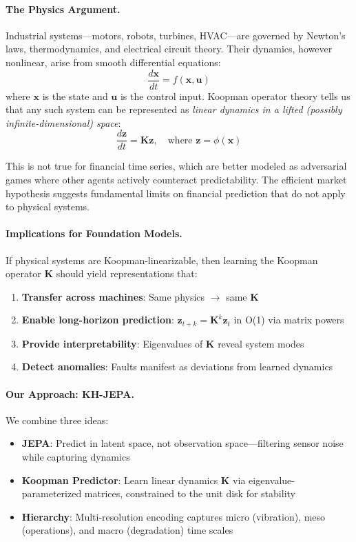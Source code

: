 \documentclass{article}
\begin{document}
\paragraph{The Physics Argument.} Industrial systems—motors, robots, turbines, HVAC—are governed by Newton's laws, thermodynamics, and electrical circuit theory. Their dynamics, however nonlinear, arise from smooth differential equations:
\begin{equation}
    \frac{d\mathbf{x}}{dt} = f(\mathbf{x}, \mathbf{u})
\end{equation}
where $\mathbf{x}$ is the state and $\mathbf{u}$ is the control input. Koopman operator theory \cite{koopman1931} tells us that any such system can be represented as \emph{linear dynamics in a lifted (possibly infinite-dimensional) space}:
\begin{equation}
    \frac{d\mathbf{z}}{dt} = \mathbf{K} \mathbf{z}, \quad \text{where } \mathbf{z} = \phi(\mathbf{x})
\end{equation}

This is not true for financial time series, which are better modeled as adversarial games where other agents actively counteract predictability. The efficient market hypothesis suggests fundamental limits on financial prediction that do not apply to physical systems.

\paragraph{Implications for Foundation Models.} If physical systems are Koopman-linearizable, then learning the Koopman operator $\mathbf{K}$ should yield representations that:
\begin{enumerate}
    \item \textbf{Transfer across machines}: Same physics $\rightarrow$ same $\mathbf{K}$
    \item \textbf{Enable long-horizon prediction}: $\mathbf{z}_{t+k} = \mathbf{K}^k \mathbf{z}_t$ in O(1) via matrix powers
    \item \textbf{Provide interpretability}: Eigenvalues of $\mathbf{K}$ reveal system modes
    \item \textbf{Detect anomalies}: Faults manifest as deviations from learned dynamics
\end{enumerate}

\paragraph{Our Approach: KH-JEPA.} We combine three ideas:
\begin{itemize}
    \item \textbf{JEPA}: Predict in latent space, not observation space—filtering sensor noise while capturing dynamics
    \item \textbf{Koopman Predictor}: Learn linear dynamics $\mathbf{K}$ via eigenvalue-parameterized matrices, constrained to the unit disk for stability
    \item \textbf{Hierarchy}: Multi-resolution encoding captures micro (vibration), meso (operations), and macro (degradation) time scales
\end{itemize}
\end{document}
